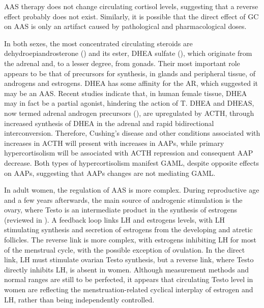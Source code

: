 \documentclass[12pt,english]{report}\usepackage[]{graphicx}\usepackage[]{color}
\begin{document}
AAS therapy does not change circulating cortisol levels\citep{baume2006effect},
suggesting that a reverse effect probably does not exist. Similarly,
it is possible that the direct effect of GC on AAS is only an artifact
caused by pathological and pharmacological doses.

In both sexes, the most concentrated circulating steroids are dehydroepiandrosterone
() and its ester, DHEA
sulfate (), which
originate from the adrenal and, to a lesser degree, from gonads. Their
most important role appears to be that of precursors for synthesis,
in glands and peripheral tissue, of androgens and estrogens. DHEA
has some affinity for the AR, which suggested it may be an AAS. Recent
studies indicate that, in human female tissue, DHEA may in fact be
a partial agonist, hindering the action of T\citep{chen2005direct}.
DHEA and DHEAS, now termed adrenal androgen precursors (),
are upregulated by ACTH, through increased synthesis of DHEA in the
adrenal and rapid bidirectional interconversion\citep{jones1970steroid,vaitukaitis1969role}.
Therefore, Cushing's disease and other conditions associated with
increases in ACTH will present with increases in AAPs, while primary
hypercortisolism will be associated with ACTH repression and consequent
AAP decrease\citep{kouyama2011clinicopathological,monteleone2006impaired,barbetta2001androgen,yamaji1984serum}.
Both types of hypercortisolism manifest GAML, despite opposite effects
on AAPs, suggesting that AAPs changes are not mediating GAML.

In adult women, the regulation of AAS is more complex. During reproductive
age and a few years afterwards, the main source of androgenic stimulation
is the ovary\citep{judd1974endocrine}, where Testo is an intermediate
product in the synthesis of estrogens (reviewed in \citep{burger2002androgen}).
A feedback loop links LH and estrogens levels, with LH stimulating
synthesis and secretion of estrogens from the developing and atretic
follicles\citep{miller2001androgen}. The reverse link is more complex,
with estrogens inhibiting LH for most of the menstrual cycle\citep{yen1971effect},
with the possible exception of ovulation. In the direct link, LH must
stimulate ovarian Testo synthesis, but a reverse link, where Testo
directly inhibits LH, is absent in women\citep{couzinet1989effects,abdel-rahman2014androgen}.
Although measurement methods and normal ranges are still to be perfected,
it appears that circulating Testo level in women are reflecting the
menstruation-related cyclical interplay of estrogen and LH, rather
than being independently controlled\citep{salonia2008menstrual,guerrero1976studies}.
\end{document}
